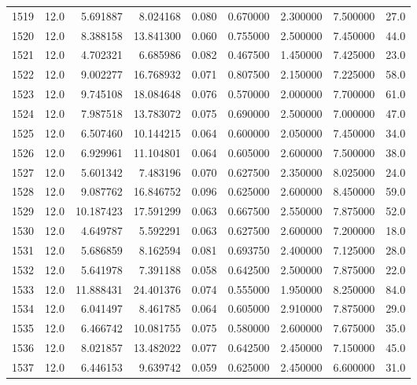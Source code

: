 \begin{tabular}{lrrrrrrrr}
1519 &   12.0 &   5.691887 &   8.024168 &  0.080 &  0.670000 &  2.300000 &   7.500000 &   27.0 \\
1520 &   12.0 &   8.388158 &  13.841300 &  0.060 &  0.755000 &  2.500000 &   7.450000 &   44.0 \\
1521 &   12.0 &   4.702321 &   6.685986 &  0.082 &  0.467500 &  1.450000 &   7.425000 &   23.0 \\
1522 &   12.0 &   9.002277 &  16.768932 &  0.071 &  0.807500 &  2.150000 &   7.225000 &   58.0 \\
1523 &   12.0 &   9.745108 &  18.084648 &  0.076 &  0.570000 &  2.000000 &   7.700000 &   61.0 \\
1524 &   12.0 &   7.987518 &  13.783072 &  0.075 &  0.690000 &  2.500000 &   7.000000 &   47.0 \\
1525 &   12.0 &   6.507460 &  10.144215 &  0.064 &  0.600000 &  2.050000 &   7.450000 &   34.0 \\
1526 &   12.0 &   6.929961 &  11.104801 &  0.064 &  0.605000 &  2.600000 &   7.500000 &   38.0 \\
1527 &   12.0 &   5.601342 &   7.483196 &  0.070 &  0.627500 &  2.350000 &   8.025000 &   24.0 \\
1528 &   12.0 &   9.087762 &  16.846752 &  0.096 &  0.625000 &  2.600000 &   8.450000 &   59.0 \\
1529 &   12.0 &  10.187423 &  17.591299 &  0.063 &  0.667500 &  2.550000 &   7.875000 &   52.0 \\
1530 &   12.0 &   4.649787 &   5.592291 &  0.063 &  0.627500 &  2.600000 &   7.200000 &   18.0 \\
1531 &   12.0 &   5.686859 &   8.162594 &  0.081 &  0.693750 &  2.400000 &   7.125000 &   28.0 \\
1532 &   12.0 &   5.641978 &   7.391188 &  0.058 &  0.642500 &  2.500000 &   7.875000 &   22.0 \\
1533 &   12.0 &  11.888431 &  24.401376 &  0.074 &  0.555000 &  1.950000 &   8.250000 &   84.0 \\
1534 &   12.0 &   6.041497 &   8.461785 &  0.064 &  0.605000 &  2.910000 &   7.875000 &   29.0 \\
1535 &   12.0 &   6.466742 &  10.081755 &  0.075 &  0.580000 &  2.600000 &   7.675000 &   35.0 \\
1536 &   12.0 &   8.021857 &  13.482022 &  0.077 &  0.642500 &  2.450000 &   7.150000 &   45.0 \\
1537 &   12.0 &   6.446153 &   9.639742 &  0.059 &  0.625000 &  2.450000 &   6.600000 &   31.0 \\

\end{tabular}
